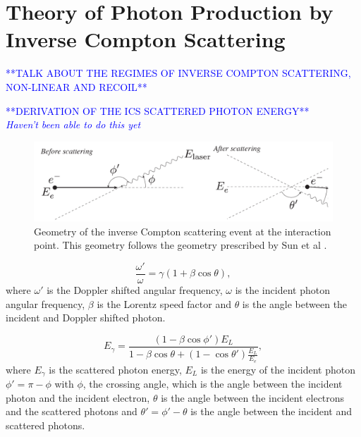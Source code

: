 \documentclass[../main.tex]{subfiles}
\begin{document}
\chapter{Theory of Photon Production by Inverse Compton Scattering}
\label{ChapterTemplate} %

\textcolor{blue}{**TALK ABOUT THE REGIMES OF INVERSE COMPTON SCATTERING, NON-LINEAR AND RECOIL**}

\textcolor{blue}{**DERIVATION OF THE ICS SCATTERED PHOTON ENERGY**\\
\textit{Haven't been able to do this yet}}

\begin{figure}[!htb]
    \centering
    \includegraphics[width=\textwidth]{Figures/scatteringkinematicsdiagram.pdf}
    \caption{Geometry of the inverse Compton scattering event at the interaction point. This geometry follows the geometry prescribed by Sun et al \cite{sun2009energy}. }
    \label{fig:scattered_photon_kinematics}
\end{figure}

\begin{equation}
\frac{\omega'}{\omega} = \gamma\left(1+\beta\cos\theta\right),
\label{eq:doppler_shift}
\end{equation}
where $\omega'$ is the Doppler shifted angular frequency, $\omega$ is the incident photon angular frequency, $\beta$ is the Lorentz speed factor and $\theta$ is the angle between the incident and Doppler shifted photon. 

\begin{equation}
E_{\gamma} = \frac{\left(1-\beta\cos\phi'\right)E_{L}}{1-\beta\cos\theta+\left(1-\cos\theta'\right)\frac{E_{L}}{E_{e}}}, 
\label{eq:scattered_photon_energy}
\end{equation}
where $E_{\gamma}$ is the scattered photon energy, $E_{L}$ is the energy of the incident photon $\phi'=\pi-\phi$ with $\phi$, the crossing angle, which is the angle between the incident photon and the incident electron, $\theta$ is the angle between the incident electrons and the scattered photons and $\theta'=\phi'-\theta$ is the angle between the incident and scattered photons.  
\end{document}
